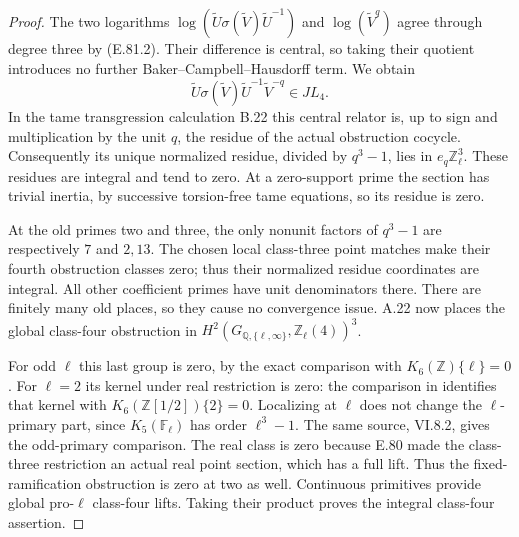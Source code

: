 \begin{proof}
The two logarithms
$\log(\widetilde U\sigma(\widetilde V)\widetilde U^{-1})$
and $\log(\widetilde V^q)$ agree through degree three by
(E.81.2). Their difference is central, so taking their quotient
introduces no further Baker--Campbell--Hausdorff term. We obtain
\[
 \widetilde U\sigma(\widetilde V)\widetilde U^{-1}
       \widetilde V^{-q}\in J L_4.
 \tag{E.81.10}
\]
In the tame transgression calculation B.22 this central relator
is, up to sign and multiplication by the unit $q$, the residue
of the actual obstruction cocycle. Consequently its unique
normalized residue, divided by $q^3-1$, lies in
$e_q\mathbb Z_\ell^3$. These residues are integral and tend
to zero. At a zero-support prime the section has trivial
inertia, by successive torsion-free tame equations, so its
residue is zero.

At the old primes two and three, the only nonunit factors of
$q^3-1$ are respectively $7$ and $2,13$. The chosen local
class-three point matches make their fourth obstruction classes
zero; thus their normalized residue coordinates are integral.
All other coefficient primes have unit denominators there.
There are finitely many old places, so they cause no convergence
issue. A.22 now places the global class-four obstruction in
$H^2(G_{\mathbb Q,\{\ell,\infty\}},\mathbb Z_\ell(4))^3$.

For odd $\ell$ this last group is zero, by the exact comparison
with $K_6(\mathbb Z)\{\ell\}=0$. For $\ell=2$ its kernel
under real restriction is zero: the comparison in
\citet[VI.9.11, case $n=6$, pp.57--58; VI.10.3, p.61]{CohWeibelKbook}
identifies that kernel with $K_6(\mathbb Z[1/2])\{2\}=0$.
Localizing at $\ell$ does not change the $\ell$-primary part,
since $K_5(\mathbb F_\ell)$ has order $\ell^3-1$.
The same source, VI.8.2, gives the odd-primary comparison.
The real class is zero because E.80 made the class-three
restriction an actual real point section, which has a full
lift. Thus the fixed-ramification obstruction is zero at two
as well. Continuous primitives provide global pro-$\ell$
class-four lifts. Taking their product proves the integral
class-four assertion.
\end{proof}

